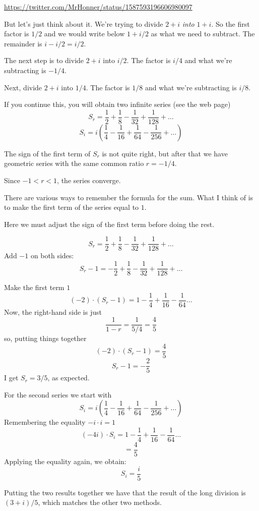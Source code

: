 \documentclass[11pt, oneside]{article}
\begin{document}
\url{https://twitter.com/MrHonner/status/1587593196606980097}

But let's just think about it.  We're trying to divide $2 + i$ \emph{into} $1 + i$.  So the first factor is $1/2$ and we would write below $1 + i/2$ as what we need to subtract.  The remainder is $i - i/2 = i/2$.  

The next step is to divide $2 + i$ into $i/2$.  The factor is $i/4$ and what we're subtracting is $-1/4$.

Next, divide $2 + i$ into $1/4$.  The factor is $1/8$ and what we're subtracting is $i/8$.

If you continue this, you will obtain two infinite series (see the web page)
\[ S_r = \frac{1}{2} + \frac{1}{8} - \frac{1}{32} + \frac{1}{128} + \dots \]
\[ S_i = i ( \frac{1}{4} - \frac{1}{16} + \frac{1}{64} - \frac{1}{256} + \dots ) \]

The sign of the first term of $S_r$ is not quite right, but after that we have geometric series with the same common ratio $r = -1/4$.

Since $-1 < r < 1$, the series converge.  

There are various ways to remember the formula for the sum.  What I think of is to make the first term of the series equal to $1$.  

Here we must adjust the sign of the first term before doing the rest.  

\[ S_r = \frac{1}{2} + \frac{1}{8} - \frac{1}{32} + \frac{1}{128} + \dots \]
Add $-1$ on both sides:
\[ S_r - 1 = - \frac{1}{2} + \frac{1}{8} - \frac{1}{32} + \frac{1}{128} + \dots \]

Make the first term $1$
\[ (-2) \cdot (S_r - 1) = 1 - \frac{1}{4} + \frac{1}{16} - \frac{1}{64} \dots \]
Now, the right-hand side is just 
\[ \frac{1}{1 - r} = \frac{1}{5/4} = \frac{4}{5} \]
so, putting things together
\[ (-2) \cdot (S_r - 1) = \frac{4}{5} \]
\[ S_r - 1 = - \frac{2}{5} \]
I get $S_r = 3/5$, as expected.

For the second series we start with
\[ S_i = i ( \frac{1}{4} - \frac{1}{16} + \frac{1}{64} - \frac{1}{256} + \dots ) \]
Remembering the equality $-i \cdot i = 1$
\[ (-4i) \cdot S_i = 1 - \frac{1}{4} + \frac{1}{16} - \frac{1}{64} \dots \]
\[ = \frac{4}{5} \]
Applying the equality again, we obtain:
\[ S_i = \frac{i}{5} \]

Putting the two results together we have that the result of the long division is $(3 + i)/5$, which matches the other two methods.
\end{document}
